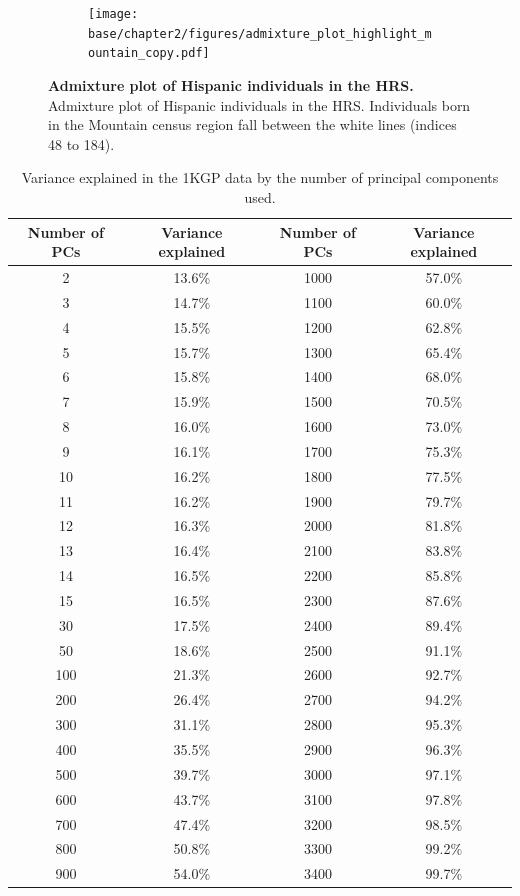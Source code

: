\newpage

\begin{figure}[ht]
    \centering
    \begin{subfigure}{\textwidth}
    \texttt{[image: base/chapter2/figures/admixture\_plot\_highlight\_mountain\_copy.pdf]}
    \end{subfigure}
    \caption[Admixture plot of Hispanic individuals in the HRS]{\textbf{Admixture plot of Hispanic individuals in the HRS.} Admixture plot of Hispanic individuals in the HRS. Individuals born in the Mountain census region fall between the white lines (indices 48 to 184).}
    \label{fig:supp_hrs_hisp_admix}
\end{figure}

\clearpage

\begin{table}[htb!]
\centering
 \begin{tabular}{||c c c c||} 
 \hline
 Number of PCs & Variance explained & Number of PCs & Variance explained  \\ [0.5ex] 
 \hline\hline
 2 & 13.6\% & 1000 & 57.0\% \\
\hline
3 & 14.7\% & 1100 & 60.0\%\\
\hline
4 & 15.5\% & 1200 & 62.8\%  \\
\hline
5 & 15.7\% & 1300 & 65.4\%\\
\hline
6 & 15.8\% & 1400 & 68.0\% \\
\hline
7 & 15.9\% & 1500 & 70.5\%\\
\hline
8 & 16.0\% & 1600 & 73.0\% \\
\hline
9 & 16.1\% & 1700 & 75.3\%\\
\hline
10 & 16.2\% & 1800 & 77.5\% \\
\hline
11 & 16.2\% & 1900 & 79.7\%\\
\hline
12 & 16.3\% & 2000 & 81.8\% \\
\hline
13 & 16.4\% & 2100 & 83.8\%\\
\hline
14 & 16.5\% & 2200 & 85.8\%\\
\hline
15 & 16.5\% & 2300 & 87.6\%\\
\hline
30 & 17.5\% & 2400 & 89.4\%\\
\hline
50 & 18.6\% & 2500 & 91.1\% \\
\hline
100 & 21.3\% & 2600 & 92.7\% \\
\hline
200 & 26.4\% & 2700 & 94.2\%\\
\hline
300 & 31.1\% & 2800 & 95.3\%\\
\hline
400 & 35.5\% & 2900 & 96.3\%\\
\hline
500 & 39.7\% & 3000 & 97.1\% \\
\hline
600 & 43.7\% & 3100 & 97.8\%\\
\hline
700 & 47.4\% & 3200 & 98.5\%\\
\hline
800 & 50.8\% & 3300 & 99.2\%\\
\hline
900 & 54.0\% & 3400 & 99.7\%\\[1ex] 
 \hline
 \end{tabular}
 \caption{Variance explained in the 1KGP data by the number of principal components used.}
 \label{table:1KGP_var_exp}
\end{table}
